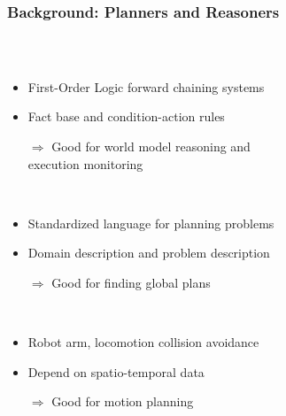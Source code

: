 \begin{frame}
  \frametitle{Background: Planners and Reasoners}
  \begin{columns}
  \begin{column}{0.83\linewidth}
  \begin{description}[]
  \item[CLIPS Rules Engine] \hfill \\
  \begin{itemize}
  \item First-Order Logic forward chaining systems
  \item Fact base and condition-action rules
  \item[$\Rightarrow$] Good for world model reasoning and\\ execution monitoring
  \end{itemize}
  \item[Planning Domain Definition Language] \hfill \\
  \begin{itemize}
  \item Standardized language for planning problems
  \item Domain description and problem description
  \item[$\Rightarrow$] Good for finding global plans
  \end{itemize}
  \item[Motion Planners] \hfill \\
  \begin{itemize}
  \item Robot arm, locomotion collision avoidance
  \item Depend on spatio-temporal data
  \item[$\Rightarrow$] Good for motion planning
  \end{itemize}
  \end{description}
  \end{column}
  \begin{column}{0.17\linewidth}

\end{column}
\end{columns}
\end{frame}

